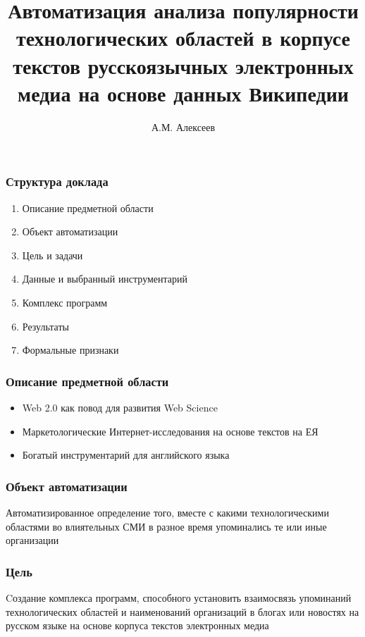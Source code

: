 \documentclass{beamer}
\begin{document}
\title{Автоматизация анализа популярности технологических областей в корпусе текстов русскоязычных электронных медиа на основе данных Википедии}
\author{А.М. Алексеев}

\frame{\titlepage}


\begin{frame}\frametitle{Структура доклада}
    \begin{enumerate}
        \item Описание предметной области
        \item Объект автоматизации
        \item Цель и задачи
        \item Данные и выбранный инструментарий
        \item Комплекс программ
        \item Результаты
        \item Формальные признаки
    \end{enumerate}
\end{frame}

\begin{frame}\frametitle{Описание предметной области}

\begin{itemize}
\item Web 2.0 как повод для развития Web Science
\item Маркетологические Интернет-исследования на основе текстов на ЕЯ
\item Богатый инструментарий для английского языка
\end{itemize}

\end{frame}
\begin{frame}\frametitle{Объект автоматизации}
Автоматизированное определение того, вместе с какими технологическими областями во влиятельных СМИ в разное время упоминались те или иные организации
\end{frame}

\begin{frame}\frametitle{Цель}
Cоздание комплекса программ, способного установить взаимосвязь упоминаний технологических областей и наименований 
организаций в блогах или новостях на русском языке на основе корпуса текстов 
электронных медиа 
\end{frame}
\end{document}
